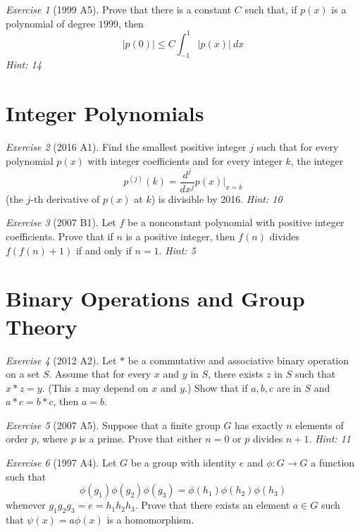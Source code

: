 \documentclass{article}
\theoremstyle{definition}
\theoremstyle{remark}
\newtheorem{exercise}{Exercise}
\begin{document}
\begin{exercise}[1999 A5]
Prove that there is a constant $C$ such that, if $p(x)$ is a polynomial of degree $1999$, then
\[|p(0)|\leqslant C\int_{-1}^1 |p(x)|\ dx\]
\emph{Hint: 14}
\end{exercise}

\section{Integer Polynomials}

\begin{exercise}[2016 A1]
Find the smallest positive integer $j$ such that for every polynomial $p(x)$ with integer coefficients and for every integer $k$, the integer
\[p^{(j)}(k) = \frac{d^j}{dx^j}p(x)\bigg|_{x=k}\] (the $j$-th derivative of $p(x)$ at $k$) is divisible by 2016. \emph{Hint: 10}
\end{exercise}

\begin{exercise}[2007 B1]
Let $f$ be a nonconstant polynomial with positive integer coefficients. Prove that if $n$ is a positive integer, then $f(n)$ divides $f(f(n)+1)$ if and only if $n=1$. \emph{Hint: 5}
\end{exercise}

\section{Binary Operations and Group Theory}

\begin{exercise}[2012 A2]
Let $*$ be a commutative and associative binary operation on a set $S$. Assume that for every $x$ and $y$ in $S$, there exists $z$ in $S$ such that $x*z=y$. (This $z$ may depend on $x$ and $y$.) Show that if $a,b,c$ are in $S$ and $a*c=b*c$, then $a = b$.
\end{exercise}

\begin{exercise}[2007 A5]
Suppose that a finite group $G$ has exactly $n$ elements of order $p$, where $p$ is a prime. Prove that either $n=0$ or $p$ divides $n+1$. \emph{Hint: 11}
\end{exercise}

\begin{exercise}[1997 A4]
Let $G$ be a group with identity $e$ and $\phi: G \rightarrow G$ a function such that 
\[\phi(g_{1})\phi(g_{2})\phi(g_{3}) = \phi(h_{1})\phi(h_{2})\phi(h_{3})
\]
whenever $g_{1}g_{2}g_{3} = e = h_{1}h_{2}h_{3}$. Prove that there exists an element $a \in G$ such that $\psi(x) = a\phi(x)$ is a homomorphism. 
\end{exercise}
\end{document}
